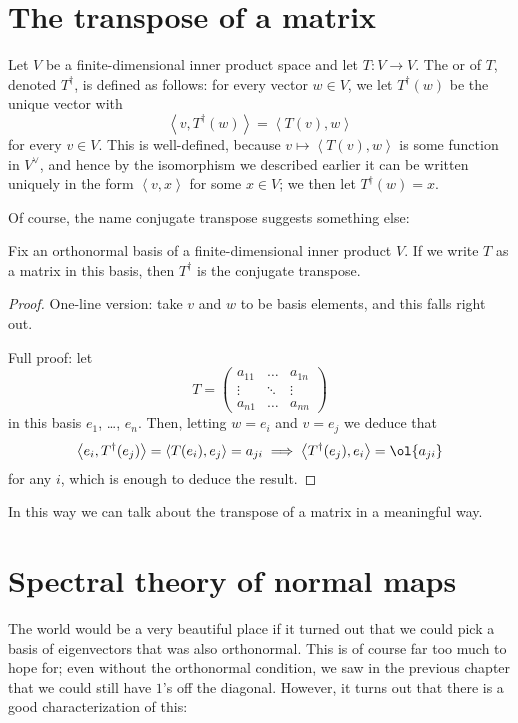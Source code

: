 \section{The transpose of a matrix}
Let $V$ be a finite-dimensional inner product space and let $T : V \to V$.
The  or  of $T$, denoted $T^\dagger$,
is defined as follows: for every vector $w \in V$, we let $T^\dagger(w)$ be the unique vector with
\[ \left< v, T^\dagger(w) \right> = \left< T(v), w \right> \]
for every $v \in V$.
This is well-defined, because $v \mapsto \left< T(v), w \right>$ is some function in $V^\vee$,
and hence by the isomorphism we described earlier it can be written uniquely in the form $\left< v, x \right>$
for some $x \in V$; we then let $T^\dagger(w) = x$.

Of course, the name conjugate transpose suggests something else:
\begin{theorem}
	Fix an orthonormal basis of a finite-dimensional inner product $V$.
	If we write $T$ as a matrix in this basis, then $T^\dagger$ is the conjugate transpose.
\end{theorem}
\begin{proof}
	One-line version: take $v$ and $w$ to be basis elements, and this falls right out.

	Full proof: let
	\[ T = \begin{pmatrix}
			a_{11} & \dots & a_{1n} \\
			\vdots & \ddots & \vdots \\
			a_{n1} & \dots & a_{nn}
		\end{pmatrix} \]
	in this basis $e_1$, \dots, $e_n$.
	Then, letting $w = e_i$ and $v = e_j$ we deduce that
	\[ \left< e_i, T^\dagger(e_j) \right> = \left< T(e_i) , e_j\right> = a_{ji}
		\implies
		\left< T^\dagger(e_j), e_i \right> = \ol{a_{ji}} \]
	for any $i$, which is enough to deduce the result.
\end{proof}

In this way we can talk about the transpose of a matrix in a meaningful way.

\section{Spectral theory of normal maps}
The world would be a very beautiful place if it turned out
that we could pick a basis of eigenvectors that was also orthonormal.
This is of course far too much to hope for; even without the orthonormal condition,
we saw in the previous chapter that we could still have $1$'s off the diagonal.
However, it turns out that there is a good characterization of this:

